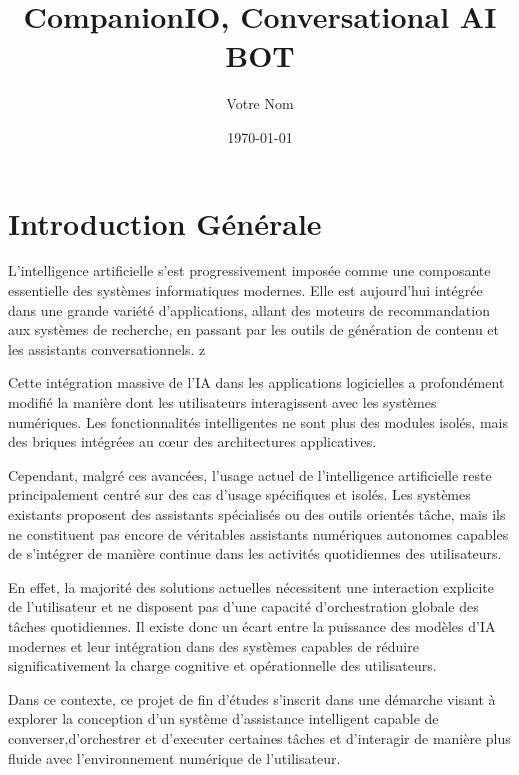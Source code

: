 \documentclass[a4paper,12pt]{report}
\title{CompanionIO, Conversational AI BOT}
\author{Votre Nom}
\date{\today}
\begin{document}
\maketitle

\tableofcontents
\listoffigures
\listoftables


\chapter*{Introduction Générale}

L’intelligence artificielle s’est progressivement imposée comme une composante essentielle des systèmes informatiques modernes. Elle est aujourd’hui intégrée dans une grande variété d’applications, allant des moteurs de recommandation aux systèmes de recherche, en passant par les outils de génération de contenu et les assistants conversationnels.
\setlength{\parskip}{6pt}z

\setlength{\parindent}{0pt}
Cette intégration massive de l’IA dans les applications logicielles a profondément modifié la manière dont les utilisateurs interagissent avec les systèmes numériques. Les fonctionnalités intelligentes ne sont plus des modules isolés, mais des briques intégrées au cœur des architectures applicatives.
\setlength{\parskip}{6pt}

Cependant, malgré ces avancées, l’usage actuel de l’intelligence artificielle reste principalement centré sur des cas d’usage spécifiques et isolés. Les systèmes existants proposent des assistants spécialisés ou des outils orientés tâche, mais ils ne constituent pas encore de véritables assistants numériques autonomes capables de s’intégrer de manière continue dans les activités quotidiennes des utilisateurs.
\setlength{\parskip}{6pt}

En effet, la majorité des solutions actuelles nécessitent une interaction explicite de l’utilisateur et ne disposent pas d’une capacité d’orchestration globale des tâches quotidiennes. Il existe donc un écart entre la puissance des modèles d’IA modernes et leur intégration dans des systèmes capables de réduire significativement la charge cognitive et opérationnelle des utilisateurs.
\setlength{\parskip}{6pt}

Dans ce contexte, ce projet de fin d’études s’inscrit dans une démarche visant à explorer la conception d’un système d’assistance intelligent capable de converser,d’orchestrer et d'executer certaines tâches et d’interagir de manière plus fluide avec l’environnement numérique de l’utilisateur.

\end{document}
